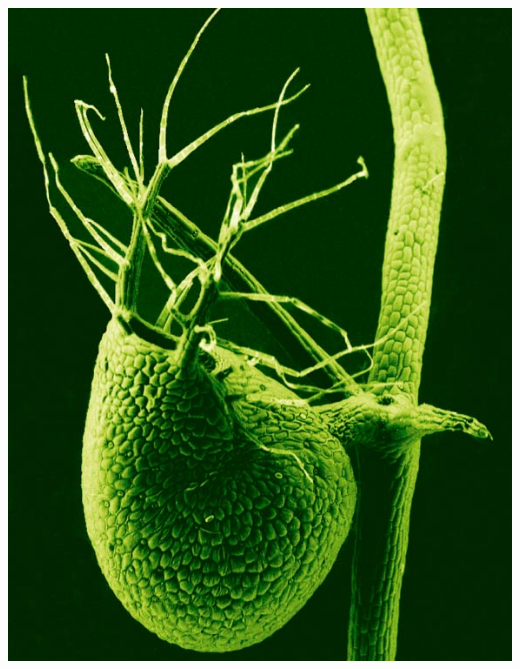 \begin{frame}
\begin{columns}[c]
        \includegraphics[height=0.3\textheight]{images/Utricularia-gibba}

\end{columns}
\end{frame}
